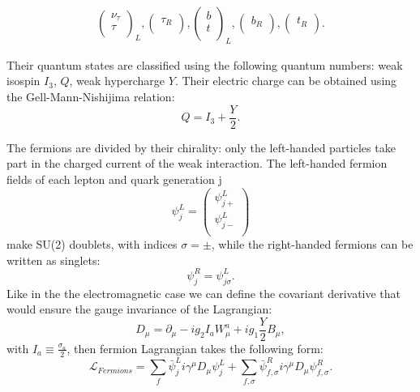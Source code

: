 \begin{align}
\begin{pmatrix}
\nu_\tau  \\
\tau \\
\end{pmatrix}_L,
\begin{pmatrix}
\tau_R \\
\end{pmatrix},
\begin{pmatrix}
b \\
t \\
\end{pmatrix}_L,
\begin{pmatrix}
b_R \\
\end{pmatrix},
\begin{pmatrix}
t_R \\
\end{pmatrix}.
\end{align}

Their quantum states are classified using the following quantum numbers: weak isospin $I_3$, $Q$, weak hypercharge $Y$. Their electric charge can be obtained using the Gell-Mann-Nishijima relation:
  \begin{equation}
Q = I_3+\frac{Y}{2}.
\end{equation}

The fermions are divided by their chirality: only the left-handed particles take part in the charged current of the weak interaction. The left-handed fermion fields of each lepton and quark generation j
  \begin{equation}
    \psi^L_j = \begin{pmatrix}
	\psi^L_{j+}  \\
	\psi^L_{j-}  \\
\end{pmatrix}
  \end{equation}
make SU(2) doublets, with indices $\sigma=\pm$, while the right-handed fermions can be written as singlets:
 \begin{equation}
\psi^R_j = \psi^L_{j\sigma}.  
\end{equation}
Like in the the electromagnetic case we can define the covariant derivative that would ensure the gauge invariance of the Lagrangian:
 \begin{equation}
D_\mu = \partial_{\mu} - ig_2I_aW^a_{\mu}+ig_1\frac{Y}{2}B_{\mu},
\end{equation}
with $I_a \equiv \frac{\sigma_a}{2}$, then fermion Lagrangian takes the following form:
 \begin{equation}
\mathcal{L}_{Fermions} = \sum_f \bar \psi^L_j i \gamma^{\mu}D_{\mu}\psi^L_j +\sum_{f,\sigma} \bar \psi^R_{f,\sigma}  i \gamma^{\mu}D_{\mu}\psi^R_{f,\sigma}  .
\end{equation}

